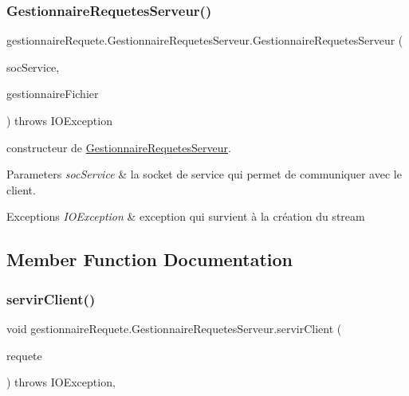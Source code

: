\subsubsection{\texorpdfstring{Gestionnaire\+Requetes\+Serveur()}{GestionnaireRequetesServeur()}}
{\footnotesize\ttfamily gestionnaire\+Requete.\+Gestionnaire\+Requetes\+Serveur.\+Gestionnaire\+Requetes\+Serveur (\begin{DoxyParamCaption}\item[{Socket}]{soc\+Service,  }\item[{\hyperlink{classterminalClient_1_1GestionnaireFichier}{Gestionnaire\+Fichier}}]{gestionnaire\+Fichier }\end{DoxyParamCaption}) throws I\+O\+Exception\hspace{0.3cm}{\ttfamily [inline]}}



constructeur de \hyperlink{classgestionnaireRequete_1_1GestionnaireRequetesServeur}{Gestionnaire\+Requetes\+Serveur}. 


\begin{DoxyParams}{Parameters}
{\em soc\+Service} & la socket de service qui permet de communiquer avec le client. \\
\hline
\end{DoxyParams}

\begin{DoxyExceptions}{Exceptions}
{\em I\+O\+Exception} & exception qui survient à la création du stream \\
\hline
\end{DoxyExceptions}


\subsection{Member Function Documentation}
\mbox{\label{classgestionnaireRequete_1_1GestionnaireRequetesServeur_a20c9f53be4a6126872c97d813afb1b51}} 
\subsubsection{\texorpdfstring{servir\+Client()}{servirClient()}}
{\footnotesize\ttfamily void gestionnaire\+Requete.\+Gestionnaire\+Requetes\+Serveur.\+servir\+Client (\begin{DoxyParamCaption}\item[{String}]{requete }\end{DoxyParamCaption}) throws I\+O\+Exception\hspace{0.3cm}{\ttfamily [inline]}, {\ttfamily [protected]}}



